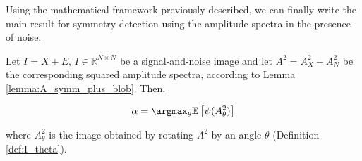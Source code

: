 Using the mathematical framework previously described, we can finally write the main result for symmetry detection using the amplitude spectra in the presence of noise.

\begin{theorem}
    \label{th:alpha_argmax_noise}
    Let $I = X + E,\,I\in\mathbb{R}^{N\times N}$ be a signal-and-noise image and let $A^2 = A^2_{X} + A^2_N$ be the corresponding squared amplitude spectra, according to Lemma \ref{lemma:A_symm_plus_blob}. Then,

    \begin{equation}
    \label{eq:alpha_argmax}
        \alpha = \argmax_\theta \mathbb{E}\left[\psi(A^2_\theta)\right]
    \end{equation}

    where $A^2_\theta$ is the image obtained by rotating $A^2$ by an angle $\theta$ (Definition \ref{def:I_theta}).
\end{theorem}

